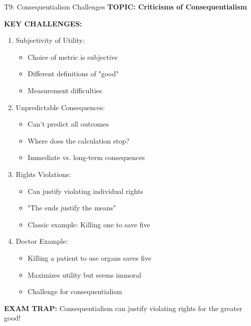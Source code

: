 \documentclass[8pt]{beamer}
\begin{document}
	\begin{frame}{T9: Consequentialism Challenges}
		\fontsize{6.5}{7.5}\selectfont
		\textbf{TOPIC: Criticisms of Consequentialism}
		
		\vspace{0.1cm}
		\textbf{KEY CHALLENGES:}
		\begin{enumerate}
			\item \textcolor{myblue}{Subjectivity of Utility:}
			\begin{itemize}
				\item Choice of metric is subjective
				\item Different definitions of "good"
				\item Measurement difficulties
			\end{itemize}
			\item \textcolor{myblue}{Unpredictable Consequences:}
			\begin{itemize}
				\item Can't predict all outcomes
				\item Where does the calculation stop?
				\item Immediate vs. long-term consequences
			\end{itemize}
			\item \textcolor{myblue}{Rights Violations:}
			\begin{itemize}
				\item Can justify violating individual rights
				\item "The ends justify the means"
				\item Classic example: Killing one to save five
			\end{itemize}
			\item \textcolor{myblue}{Doctor Example:}
			\begin{itemize}
				\item Killing a patient to use organs saves five
				\item Maximizes utility but seems immoral
				\item Challenge for consequentialism
			\end{itemize}
		\end{enumerate}
		
		\textcolor{myred}{\textbf{EXAM TRAP:}} Consequentialism can justify \textcolor{myblue}{violating rights for the greater good}!
	\end{frame}
	
\end{document}
